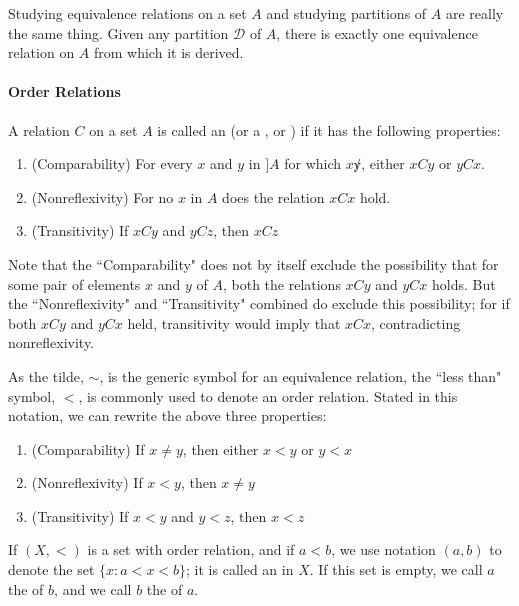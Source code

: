 Studying equivalence relations on a set $A$ and studying partitions of $A$ are really the same thing. Given any partition $\mathcal{D}$ of $A$, there is exactly one equivalence relation on $A$ from which it is derived.

\paragraph{Order Relations} A relation $C$ on a set $A$ is called an \textbf{} (or a , or ) if it has the following properties:
\begin{enumerate}[itemsep=0pt]
    \item (Comparability) For every $x$ and $y$ in $]A$ for which $x \not y$, either $xCy$ or $yCx$.
    \item (Nonreflexivity) For no $x$ in $A$ does the relation $xCx$ hold.
    \item (Transitivity) If $xCy$ and $yCz$, then $xCz$
\end{enumerate}

Note that the ``Comparability" does not by itself exclude the possibility that for some pair of elements $x$ and $y$ of $A$, both the relations $xCy$ and $yCx$ holds. But the ``Nonreflexivity" and ``Transitivity" combined do exclude this possibility; for if both $xCy$ and $yCx$ held, transitivity would imply that $xCx$, contradicting nonreflexivity.

As the tilde, $\sim$, is the generic symbol for an equivalence relation, the ``less than" symbol, $<$, is commonly used to denote an order relation. Stated in this notation, we can rewrite the above three properties:
\begin{enumerate}[itemsep=0pt]
    \item (Comparability) If $x \neq y$, then either $x < y$ or $y < x$
    \item (Nonreflexivity) If $x < y$, then $x \neq y$
    \item (Transitivity) If $x < y$ and $y < z$, then $x < z$
\end{enumerate}

\begin{definition}
If $(X, <)$ is a set with order relation, and if $a < b$, we use notation $(a, b)$ to denote the set $\{x: a < x < b\}$; it is called an \textbf{} in $X$. If this set is empty, we call $a$ the \textbf{} of $b$, and we call $b$ the \textbf{} of $a$.
\end{definition}

